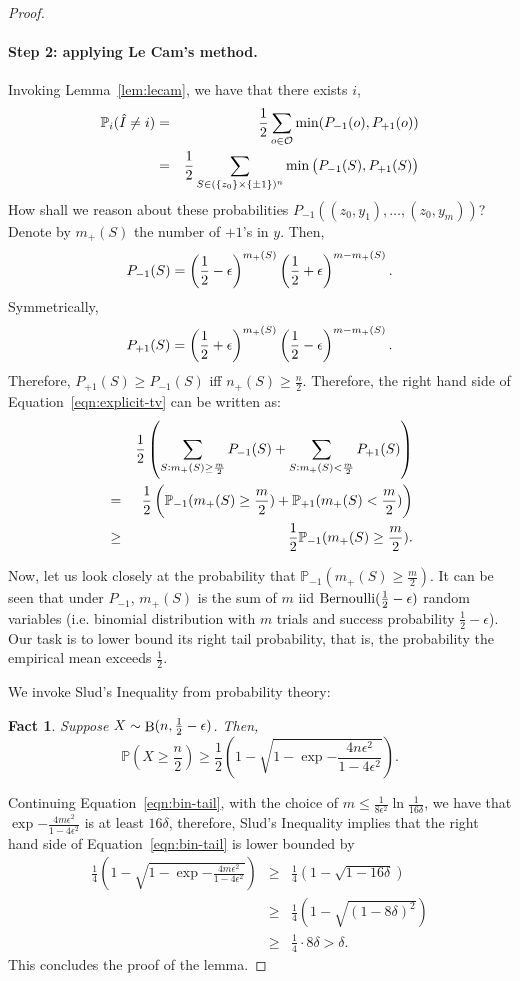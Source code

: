 \documentclass{article}
\newtheorem{fact}{Fact}
\DeclareMathOperator*{\Bin}{{\rm B}}
\newcommand{\PP}{\mathbb{P}}
\newcommand{\Ocal}{\mathcal{O}}
\DeclareMathOperator*{\Ber}{{\rm Bernoulli}}
\begin{document}
\begin{proof}
\paragraph{Step 2: applying Le Cam's method.}
Invoking Lemma~\ref{lem:lecam},
we have that there exists $i$,
\begin{eqnarray}
  \PP_i(\hat{I} \neq i)
  &=& \frac12\sum_{o \in \Ocal} \min(P_{-1}(o), P_{+1}(o)) \nonumber \\
  &=& \frac12\sum_{S \in (\cbr{z_0} \times \cbr{\pm 1})^n} \min\del{P_{-1}(S), P_{+1}(S)}
  \label{eqn:explicit-tv}
\end{eqnarray}
How shall we reason about these probabilities
$P_{-1}((z_0, y_1), \ldots, (z_0, y_m))$? Denote by $m_+(S)$ the number of
$+1$'s in $y$. Then,
\[ P_{-1}(S) = \del{\frac12 - \epsilon}^{m_+(S)}\del{\frac12 + \epsilon}^{m-m_+(S)}. \]
Symmetrically,
\[ P_{+1}(S) = \del{\frac12 + \epsilon}^{m_+(S)}\del{\frac12 - \epsilon}^{m-m_+(S)}. \]
Therefore, $P_{+1}(S) \geq P_{-1}(S)$ iff $n_+(S) \geq \frac n 2$. Therefore,
the right hand side of Equation~\eqref{eqn:explicit-tv} can be written as:
\begin{eqnarray}
  && \frac12
  \del{\sum_{S: m_+(S) \geq \frac m 2} P_{-1}(S)+\sum_{S: m_+(S) < \frac m 2} P_{+1}(S)} \nonumber \\
  &=& \frac 12 \del{\PP_{-1}(m_+(S) \geq \frac m 2) + \PP_{+1}(m_+(S) < \frac m 2)} \nonumber \\
  &\geq& \frac 12 \PP_{-1}(m_+(S) \geq \frac m 2).
  \label{eqn:bin-tail}
\end{eqnarray}

Now, let us look closely at the probability that
$\PP_{-1}(m_+(S) \geq \frac m 2)$. It can be seen that under $P_{-1}$,
$m_+(S)$ is the sum of $m$ iid $\Ber(\frac12-\epsilon)$ random variables (i.e.  binomial distribution with $m$ trials and success probability $\frac12-\epsilon$).
Our task is to lower bound its right tail probability, that is, the probability the empirical mean exceeds $\frac12$.

We invoke Slud's Inequality from probability theory:
\begin{fact}
Suppose $X \sim \Bin(n,\frac12-\epsilon)$. Then,
\[ \PP(X \geq \frac n 2) \geq \frac12 (1 - \sqrt{1 - \exp{-\frac{4 n \epsilon^2}{1 - 4\epsilon^2}}}). \]
\end{fact}

Continuing Equation~\eqref{eqn:bin-tail}, with the choice of $m \leq \frac{1}{8\epsilon^2} \ln\frac1{16\delta}$, we have that $\exp{-\frac{4 m \epsilon^2}{1 - 4\epsilon^2}}$ is at least $16\delta$, therefore, Slud's Inequality implies that the right hand side of Equation~\eqref{eqn:bin-tail} is lower bounded by
\begin{eqnarray*}
  \frac14 (1 - \sqrt{1 - \exp{-\frac{4 m \epsilon^2}{1 - 4\epsilon^2}}})
  &\geq& \frac14 (1 - \sqrt{1 - 16\delta}) \\
  &\geq& \frac14 (1 - \sqrt{(1 - 8\delta)^2}) \\
  &\geq& \frac 1 4 \cdot 8\delta > \delta.
\end{eqnarray*}
This concludes the proof of the lemma.
\end{proof}
\end{document}
